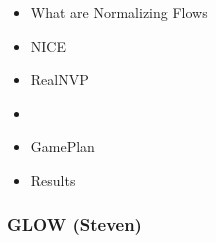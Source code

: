 \begin{frame}
\begin{itemize}
    \item What are Normalizing Flows
    \item NICE
    \item RealNVP
    \item \textbf{\color{red}{GLOW}}
    \item GamePlan
    \item Results
\end{itemize}
\end{frame}

\begin{frame}
    \frametitle{GLOW (Steven)}
\end{frame}
